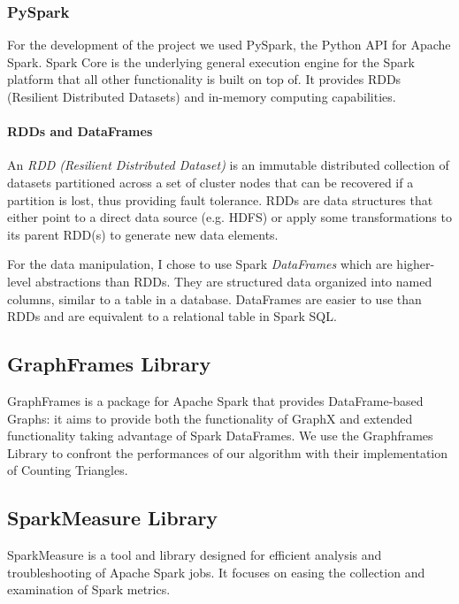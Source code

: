 \documentclass[a4paper,11pt, twoside]{article}
\begin{document}
            \subsubsection{PySpark}
            For the development of the project we used PySpark, the Python API for Apache Spark. Spark Core is the underlying general execution engine for the Spark platform that all other functionality is built on top of. It provides RDDs (Resilient Distributed Datasets) and in-memory computing capabilities. \cite{pyspark}
    
            \paragraph{RDDs and DataFrames}
            An \textit{RDD (Resilient Distributed Dataset)} is an immutable distributed collection of datasets partitioned across a set of cluster nodes that can be recovered if a partition is lost, thus providing fault tolerance.
            RDDs are data structures that either point to a direct data source (e.g. HDFS) or apply some transformations to its parent RDD(s) to generate new data elements. 
            
            For the data manipulation, I chose to use Spark \textit{DataFrames} which are higher-level abstractions than RDDs. They are structured data organized into named columns, similar to a table in a database. DataFrames are easier to use than RDDs and are equivalent to a relational table in Spark SQL. \cite{pyspark}
    
        \subsection{GraphFrames Library}
        GraphFrames is a package for Apache Spark that provides DataFrame-based Graphs: it aims to provide both the functionality of GraphX and extended functionality taking advantage of Spark DataFrames. We use the Graphframes Library to confront the performances of our algorithm with their implementation of Counting Triangles. \cite{graphframes}
    
        \subsection{SparkMeasure Library}
        SparkMeasure is a tool and library designed for efficient analysis and troubleshooting of Apache Spark jobs. It focuses on easing the collection and examination of Spark metrics. \cite{sparkmeasure}
    
\end{document}
